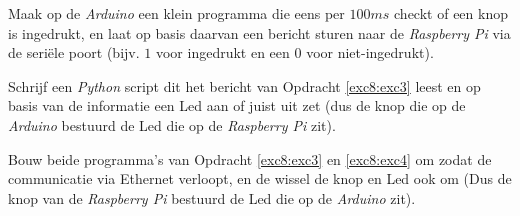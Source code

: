 \begin{exercise}
  \label{exc8:exc3}
  Maak op de \textit{Arduino} een klein programma die eens per $100ms$ checkt of een knop is ingedrukt, en laat op basis daarvan een bericht sturen naar de \textit{Raspberry Pi} via de seriële poort (bijv. $1$ voor ingedrukt en een $0$ voor niet-ingedrukt). 
\end{exercise}

\begin{exercise}
  \label{exc8:exc4}
  Schrijf een \textit{Python} script dit het bericht van Opdracht \ref{exc8:exc3} leest en op basis van de informatie een Led aan of juist uit zet (dus de knop die op de \textit{Arduino} bestuurd de Led die op de \textit{Raspberry Pi} zit).
\end{exercise}

\begin{exercise}
  Bouw beide programma's van Opdracht \ref{exc8:exc3} en \ref{exc8:exc4} om zodat de communicatie via Ethernet verloopt, en de wissel de knop en Led ook om (Dus de knop van de \textit{Raspberry Pi} bestuurd de Led die op de \textit{Arduino} zit).
\end{exercise}

